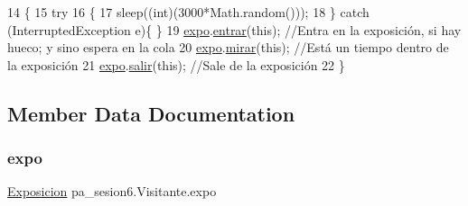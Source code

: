 \begin{DoxyCode}
14     \{
15         \textcolor{keywordflow}{try}
16         \{
17             sleep((\textcolor{keywordtype}{int})(3000*Math.random()));
18         \} \textcolor{keywordflow}{catch} (InterruptedException e)\{ \}
19         \mbox{\hyperlink{classpa__sesion6_1_1_visitante_a09960f68f8c9a0d5d44bd607c11d6675}{expo}}.\mbox{\hyperlink{classpa__sesion6_1_1_exposicion_a290de0143a4ac3d4144b59da8998590f}{entrar}}(\textcolor{keyword}{this}); \textcolor{comment}{//Entra en la exposición, si hay hueco; y sino espera en la cola}
20         \mbox{\hyperlink{classpa__sesion6_1_1_visitante_a09960f68f8c9a0d5d44bd607c11d6675}{expo}}.\mbox{\hyperlink{classpa__sesion6_1_1_exposicion_a88cad59e332e16a6a199ca599d70239f}{mirar}}(\textcolor{keyword}{this}); \textcolor{comment}{//Está un tiempo dentro de la exposición}
21         \mbox{\hyperlink{classpa__sesion6_1_1_visitante_a09960f68f8c9a0d5d44bd607c11d6675}{expo}}.\mbox{\hyperlink{classpa__sesion6_1_1_exposicion_af3dad6816f86cb8fccc96b5347820a8d}{salir}}(\textcolor{keyword}{this}); \textcolor{comment}{//Sale de la exposición}
22     \}
\end{DoxyCode}


\subsection{Member Data Documentation}
\mbox{\label{classpa__sesion6_1_1_visitante_a09960f68f8c9a0d5d44bd607c11d6675}} 
\subsubsection{\texorpdfstring{expo}{expo}}
{\footnotesize\ttfamily \mbox{\hyperlink{classpa__sesion6_1_1_exposicion}{Exposicion}} pa\+\_\+sesion6.\+Visitante.\+expo\hspace{0.3cm}{\ttfamily [package]}}

